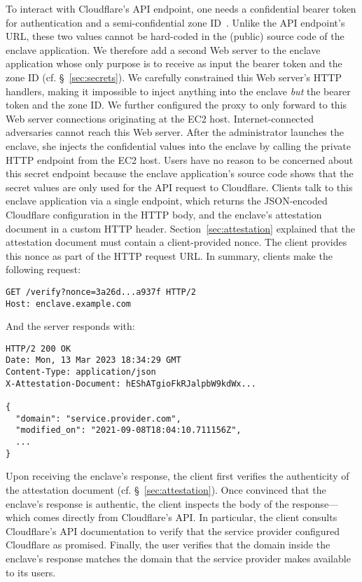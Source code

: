 To interact with Cloudflare's API endpoint, one needs a confidential bearer
token for authentication and a semi-confidential zone ID~\cite{spectrum-config}.
Unlike the API endpoint's URL, these two values cannot be hard-coded in the
(public) source code of the enclave application.  We therefore add a second Web
server to the enclave application whose only purpose is to receive as input the
bearer token and the zone ID (cf.  \S~\ref{sec:secrets}).  We carefully
constrained this Web server's HTTP handlers, making it impossible to inject
anything into the enclave \emph{but} the bearer token and the zone ID.  We
further configured the proxy to only forward to this Web server connections
originating at the EC2 host.  Internet-connected adversaries cannot reach this
Web server.  After the administrator launches the enclave, she injects the
confidential values into the enclave by calling the private HTTP endpoint from
the EC2 host.  Users have no reason to be concerned about this secret endpoint
because the enclave application's source code shows that the secret values are
only used for the API request to Cloudflare.  Clients talk to this enclave
application via a single endpoint, which returns the JSON-encoded Cloudflare
configuration in the HTTP body, and the enclave's attestation document in a
custom HTTP header.  Section~\ref{sec:attestation} explained that the
attestation document must contain a client-provided nonce.  The client provides
this nonce as part of the HTTP request URL.  In summary, clients make the
following request:

\begin{lstlisting}[numbers=none,basicstyle=\small\ttfamily]
GET /verify?nonce=3a26d...a937f HTTP/2
Host: enclave.example.com
\end{lstlisting}

And the server responds with:

\begin{lstlisting}[numbers=none,basicstyle=\small\ttfamily]
HTTP/2 200 OK
Date: Mon, 13 Mar 2023 18:34:29 GMT
Content-Type: application/json
X-Attestation-Document: hEShATgioFkRJalpbW9kdWx...

{
  "domain": "service.provider.com",
  "modified_on": "2021-09-08T18:04:10.711156Z",
  ...
}
\end{lstlisting}

Upon receiving the enclave's response, the client first verifies the
authenticity of the attestation document (cf. \S~\ref{sec:attestation}).  Once
convinced that the enclave's response is authentic, the client inspects the
body of the response---which comes directly from Cloudflare's API.  In
particular, the client consults Cloudflare's API documentation to verify that
the service provider configured Cloudflare as promised.  Finally, the user
verifies that the domain inside the enclave's response matches the domain that
the service provider makes available to its users.

